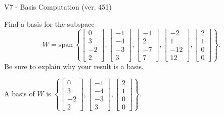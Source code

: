\begin{exercise}
  \begin{exerciseTitle}V7 - Basis Computation (ver. 451)\end{exerciseTitle}
  \begin{exerciseStatement}
    Find a basis for the subspace 
\[W=\mathrm{span}\ \left\{\left[\begin{array}{r}
0 \\
3 \\
-2 \\
2
\end{array}\right] , \left[\begin{array}{r}
-1 \\
-4 \\
-3 \\
3
\end{array}\right] , \left[\begin{array}{r}
-1 \\
2 \\
-7 \\
7
\end{array}\right] , \left[\begin{array}{r}
-2 \\
1 \\
-12 \\
12
\end{array}\right] , \left[\begin{array}{r}
2 \\
1 \\
0 \\
0
\end{array}\right]\right\}.\]
 Be sure to explain why your result is a basis.


  \end{exerciseStatement}
  \begin{exerciseAnswer}
   A basis of \(W\) is  \(\left\{\left[\begin{array}{r}
0 \\
3 \\
-2 \\
2
\end{array}\right] , \left[\begin{array}{r}
-1 \\
-4 \\
-3 \\
3
\end{array}\right] , \left[\begin{array}{r}
2 \\
1 \\
0 \\
0
\end{array}\right]\right\}\).
  


  \end{exerciseAnswer}
\end{exercise}